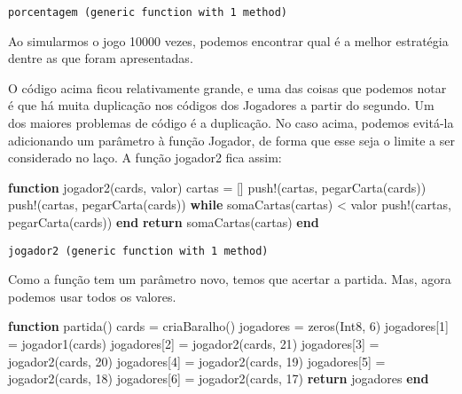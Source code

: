 \documentclass[
  letterpaper,
  DIV=11,
  numbers=noendperiod]{scrreprt}
\newenvironment{Shaded}{\begin{snugshade}}{\end{snugshade}}
\newcommand{\ControlFlowTok}[1]{\textcolor[rgb]{0.00,0.23,0.31}{\textbf{#1}}}
\newcommand{\DataTypeTok}[1]{\textcolor[rgb]{0.68,0.00,0.00}{#1}}
\newcommand{\FloatTok}[1]{\textcolor[rgb]{0.68,0.00,0.00}{#1}}
\newcommand{\FunctionTok}[1]{\textcolor[rgb]{0.28,0.35,0.67}{#1}}
\newcommand{\KeywordTok}[1]{\textcolor[rgb]{0.00,0.23,0.31}{\textbf{#1}}}
\newcommand{\NormalTok}[1]{\textcolor[rgb]{0.00,0.23,0.31}{#1}}
\newcommand{\OperatorTok}[1]{\textcolor[rgb]{0.37,0.37,0.37}{#1}}
\begin{document}
\begin{verbatim}
porcentagem (generic function with 1 method)
\end{verbatim}

Ao simularmos o jogo 10000 vezes, podemos encontrar qual é a melhor
estratégia dentre as que foram apresentadas.

O código acima ficou relativamente grande, e uma das coisas que podemos
notar é que há muita duplicação nos códigos dos Jogadores a partir do
segundo. Um dos maiores problemas de código é a duplicação. No caso
acima, podemos evitá-la adicionando um parâmetro à função Jogador, de
forma que esse seja o limite a ser considerado no laço. A função
jogador2 fica assim:

\begin{Shaded}
\begin{Highlighting}[]
\KeywordTok{function} \FunctionTok{jogador2}\NormalTok{(cards, valor)}
\NormalTok{    cartas }\OperatorTok{=}\NormalTok{ []}
    \FunctionTok{push!}\NormalTok{(cartas, }\FunctionTok{pegarCarta}\NormalTok{(cards))}
    \FunctionTok{push!}\NormalTok{(cartas, }\FunctionTok{pegarCarta}\NormalTok{(cards))}
    \ControlFlowTok{while} \FunctionTok{somaCartas}\NormalTok{(cartas) }\OperatorTok{\textless{}}\NormalTok{ valor}
       \FunctionTok{push!}\NormalTok{(cartas, }\FunctionTok{pegarCarta}\NormalTok{(cards))}
    \ControlFlowTok{end}
    \ControlFlowTok{return} \FunctionTok{somaCartas}\NormalTok{(cartas)}
\KeywordTok{end}
\end{Highlighting}
\end{Shaded}

\begin{verbatim}
jogador2 (generic function with 1 method)
\end{verbatim}

Como a função tem um parâmetro novo, temos que acertar a partida. Mas,
agora podemos usar todos os valores.

\begin{Shaded}
\begin{Highlighting}[]
\KeywordTok{function} \FunctionTok{partida}\NormalTok{()}
\NormalTok{   cards }\OperatorTok{=} \FunctionTok{criaBaralho}\NormalTok{()}
\NormalTok{   jogadores }\OperatorTok{=} \FunctionTok{zeros}\NormalTok{(}\DataTypeTok{Int8}\NormalTok{, }\FloatTok{6}\NormalTok{)}
\NormalTok{   jogadores[}\FloatTok{1}\NormalTok{] }\OperatorTok{=} \FunctionTok{jogador1}\NormalTok{(cards)}
\NormalTok{   jogadores[}\FloatTok{2}\NormalTok{] }\OperatorTok{=} \FunctionTok{jogador2}\NormalTok{(cards, }\FloatTok{21}\NormalTok{)}
\NormalTok{   jogadores[}\FloatTok{3}\NormalTok{] }\OperatorTok{=} \FunctionTok{jogador2}\NormalTok{(cards, }\FloatTok{20}\NormalTok{)}
\NormalTok{   jogadores[}\FloatTok{4}\NormalTok{] }\OperatorTok{=} \FunctionTok{jogador2}\NormalTok{(cards, }\FloatTok{19}\NormalTok{)}
\NormalTok{   jogadores[}\FloatTok{5}\NormalTok{] }\OperatorTok{=} \FunctionTok{jogador2}\NormalTok{(cards, }\FloatTok{18}\NormalTok{)}
\NormalTok{   jogadores[}\FloatTok{6}\NormalTok{] }\OperatorTok{=} \FunctionTok{jogador2}\NormalTok{(cards, }\FloatTok{17}\NormalTok{)}
   \ControlFlowTok{return}\NormalTok{ jogadores}
\KeywordTok{end}
\end{Highlighting}
\end{Shaded}
\end{document}
